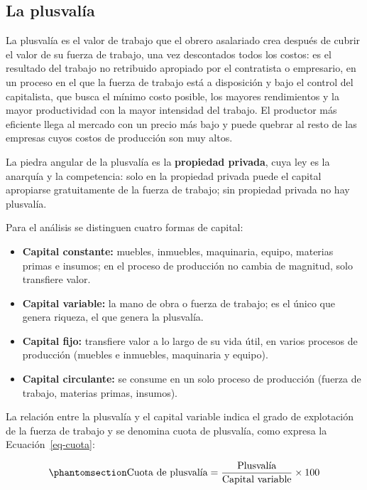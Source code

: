\documentclass[
  man,
  floatsintext,
  longtable,
  a4paper,
  nolmodern,
  notxfonts,
  notimes,
  12pt,
  colorlinks=true,linkcolor=blue,citecolor=blue,urlcolor=blue]{apa7}
\providecommand{\tightlist}{%
  \setlength{\itemsep}{0pt}\setlength{\parskip}{0pt}}
\begin{document}
\subsection{La plusvalía}\label{la-plusvaluxeda}

La plusvalía es el valor de trabajo que el obrero asalariado crea
después de cubrir el valor de su fuerza de trabajo, una vez descontados
todos los costos: es el resultado del trabajo no retribuido apropiado
por el contratista o empresario, en un proceso en el que la fuerza de
trabajo está a disposición y bajo el control del capitalista, que busca
el mínimo costo posible, los mayores rendimientos y la mayor
productividad con la mayor intensidad del trabajo. El productor más
eficiente llega al mercado con un precio más bajo y puede quebrar al
resto de las empresas cuyos costos de producción son muy altos.

La piedra angular de la plusvalía es la \textbf{propiedad privada}, cuya
ley es la anarquía y la competencia: solo en la propiedad privada puede
el capital apropiarse gratuitamente de la fuerza de trabajo; sin
propiedad privada no hay plusvalía.

Para el análisis se distinguen cuatro formas de capital:

\begin{itemize}
\tightlist
\item
  \textbf{Capital constante:} muebles, inmuebles, maquinaria, equipo,
  materias primas e insumos; en el proceso de producción no cambia de
  magnitud, solo transfiere valor.
\item
  \textbf{Capital variable:} la mano de obra o fuerza de trabajo; es el
  único que genera riqueza, el que genera la plusvalía.
\item
  \textbf{Capital fijo:} transfiere valor a lo largo de su vida útil, en
  varios procesos de producción (muebles e inmuebles, maquinaria y
  equipo).
\item
  \textbf{Capital circulante:} se consume en un solo proceso de
  producción (fuerza de trabajo, materias primas, insumos).
\end{itemize}

La relación entre la plusvalía y el capital variable indica el grado de
explotación de la fuerza de trabajo y se denomina cuota de plusvalía,
como expresa la Ecuación~\ref{eq-cuota}:

\begin{equation}\protect\phantomsection\label{eq-cuota}{
\text{Cuota de plusvalía} = \frac{\text{Plusvalía}}{\text{Capital variable}} \times 100
}\end{equation}
\end{document}
